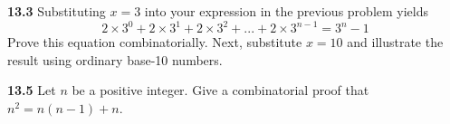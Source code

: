 \documentclass[10pt]{article}
\begin{document}
\pagebreak

\begin{framed}
    \textbf{13.3} Substituting $x = 3$ into your expression in the previous problem yields
    $$
    2\times3^0+2\times3^1+2\times3^2+...+2\times3^{n-1} = 3^n-1
    $$
    Prove this equation combinatorially.
    Next, substitute $x = 10$ and illustrate the result using ordinary base-10 numbers.
\end{framed}

\pagebreak

\begin{framed}
    \textbf{13.5} Let $n$ be a positive integer. Give a combinatorial proof that $n^2 = n(n-1)+n$.
\end{framed}
\end{document}
